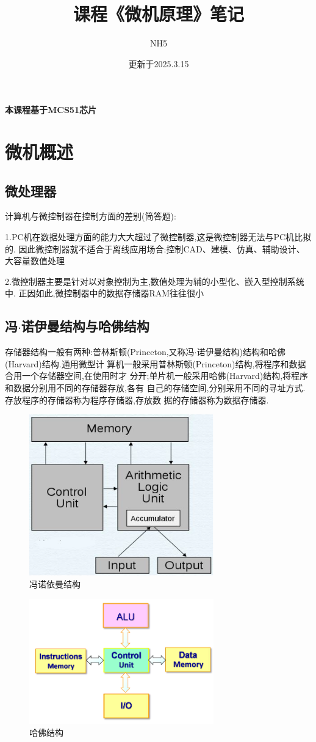 \documentclass[12pt,a4paper,oneside]{ctexart}
\title{课程《微机原理》笔记}
\author{NH5}
\date{更新于2025.3.15}
\begin{document}
\maketitle
\textbf{本课程基于MCS51芯片}

\section{微机概述}
\subsection{微处理器}
计算机与微控制器在控制方面的差别(简答题):

1.PC机在数据处理方面的能力大大超过了微控制器,这是微控制器无法与PC机比拟的.
因此微控制器就不适合于离线应用场合:控制CAD、建模、仿真、辅助设计、大容量数值处理

2.微控制器主要是针对以对象控制为主,数值处理为辅的小型化、嵌入型控制系统中.
正因如此,微控制器中的数据存储器RAM往往很小

\subsection{冯$\cdot$诺伊曼结构与哈佛结构}
存储器结构一般有两种:普林斯顿(Princeton,又称冯$\cdot$诺伊曼结构)结构和哈佛(Harvard)结构.通用微型计
算机一般采用普林斯顿(Princeton)结构,将程序和数据合用一个存储器空间,在使用时才
分开;单片机一般采用哈佛(Harvard)结构,将程序和数据分别用不同的存储器存放,各有
自己的存储空间,分别采用不同的寻址方式.存放程序的存储器称为程序存储器,存放数
据的存储器称为数据存储器.
\begin{figure}[H]
    \centering
    \includegraphics[width=8cm]{photos/冯诺依曼结构.png}
    \caption{冯诺依曼结构}
\end{figure}
\begin{figure}[H]
    \centering
    \includegraphics[width=8cm]{photos/哈佛结构.png}
    \caption{哈佛结构}
\end{figure}
\end{document}
